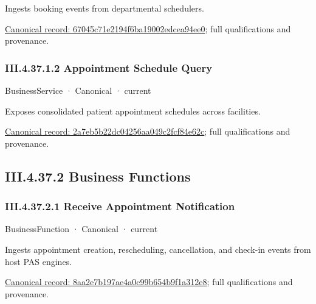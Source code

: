 Ingests booking events from departmental schedulers.


{\footnotesize \href{../../../../continuum/business/business-service/67045c71e2194f6ba19002edcea94ee0.md}{Canonical record: 67045c71e2194f6ba19002edcea94ee0}; full qualifications and provenance.}\par
\subsubsection*{III.4.37.1.2 Appointment Schedule Query}
\label{navigation:III.4.37.1.2}

\label{element:2a7eb5b22dc04256aa049c2fcf84e62c}
{\small BusinessService · Canonical · current}\par

Exposes consolidated patient appointment schedules across facilities.


{\footnotesize \href{../../../../continuum/business/business-service/2a7eb5b22dc04256aa049c2fcf84e62c.md}{Canonical record: 2a7eb5b22dc04256aa049c2fcf84e62c}; full qualifications and provenance.}\par
\subsection*{III.4.37.2 Business Functions}
\label{navigation:III.4.37.2}

\subsubsection*{III.4.37.2.1 Receive Appointment Notification}
\label{navigation:III.4.37.2.1}

\label{element:8aa2e7b197ae4a0c99b654b9f1a312e8}
{\small BusinessFunction · Canonical · current}\par

Ingests appointment creation, rescheduling, cancellation, and check-in events from host PAS engines.


{\footnotesize \href{../../../../continuum/business/business-function/8aa2e7b197ae4a0c99b654b9f1a312e8.md}{Canonical record: 8aa2e7b197ae4a0c99b654b9f1a312e8}; full qualifications and provenance.}\par
